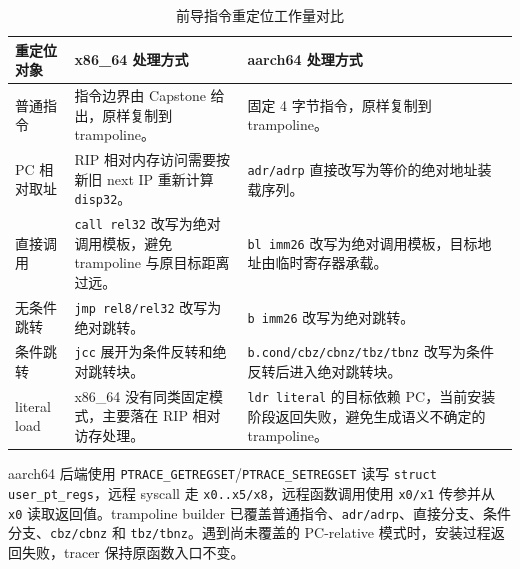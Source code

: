 \documentclass[UTF8,a4paper,11pt,fontset=fandol]{ctexart}
\newcommand{\code}[1]{\texttt{#1}}
\begin{document}
\begin{table}[H]
\centering
\caption{前导指令重定位工作量对比}
\label{tab:relocation-compare}
\begin{tabularx}{\textwidth}{P{3.25cm}Y Y}
\toprule
\textbf{重定位对象} & \textbf{x86\_64 处理方式} & \textbf{aarch64 处理方式}\\
\midrule
普通指令 & 指令边界由 Capstone 给出，原样复制到 trampoline。 & 固定 4 字节指令，原样复制到 trampoline。\\
PC 相对取址 & RIP 相对内存访问需要按新旧 next IP 重新计算 \code{disp32}。 & \code{adr/adrp} 直接改写为等价的绝对地址装载序列。\\
直接调用 & \code{call rel32} 改写为绝对调用模板，避免 trampoline 与原目标距离过远。 & \code{bl imm26} 改写为绝对调用模板，目标地址由临时寄存器承载。\\
无条件跳转 & \code{jmp rel8/rel32} 改写为绝对跳转。 & \code{b imm26} 改写为绝对跳转。\\
条件跳转 & \code{jcc} 展开为条件反转和绝对跳转块。 & \code{b.cond/cbz/cbnz/tbz/tbnz} 改写为条件反转后进入绝对跳转块。\\
literal load & x86\_64 没有同类固定模式，主要落在 RIP 相对访存处理。 & \code{ldr literal} 的目标依赖 PC，当前安装阶段返回失败，避免生成语义不确定的 trampoline。\\
\bottomrule
\end{tabularx}
\end{table}

aarch64 后端使用 \code{PTRACE\_GETREGSET}/\code{PTRACE\_SETREGSET} 读写 \code{struct user\_pt\_regs}，远程 syscall 走 \code{x0..x5/x8}，远程函数调用使用 \code{x0/x1} 传参并从 \code{x0} 读取返回值。trampoline builder 已覆盖普通指令、\code{adr/adrp}、直接分支、条件分支、\code{cbz/cbnz} 和 \code{tbz/tbnz}。遇到尚未覆盖的 PC-relative 模式时，安装过程返回失败，tracer 保持原函数入口不变。
\end{document}
